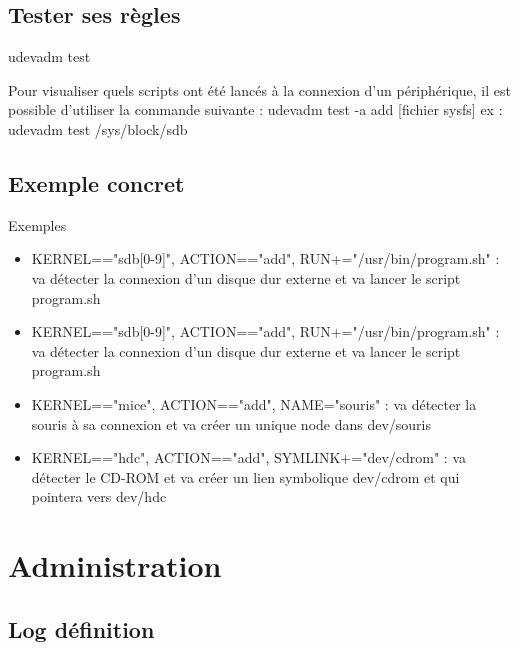 \documentclass{beamer}
\begin{document}
\subsection{Tester ses règles}
\begin{frame}
\begin{exampleblock}{udevadm test} 
		
		Pour visualiser quels scripts ont été lancés à la connexion d'un périphérique, il est possible d'utiliser la commande suivante : 
		udevadm test -a add [fichier sysfs] \newline ex : udevadm test /sys/block/sdb
\end{exampleblock}
\end{frame}

\subsection{Exemple concret}
\begin{frame}
\begin{exampleblock}{Exemples} 
	
	\begin{itemize}
		
		[circle]
		\item KERNEL=="sdb[0-9]", ACTION=="add", RUN+="/usr/bin/program.sh" : va détecter la connexion d'un disque dur externe et va lancer le script program.sh
		\item KERNEL=="sdb[0-9]", ACTION=="add", RUN+="/usr/bin/program.sh" : va détecter la connexion d'un disque dur externe et va lancer le script program.sh
		\item KERNEL=="mice", ACTION=="add", NAME="souris" : va détecter la souris à sa connexion et va créer un unique node dans dev/souris
		\item KERNEL=="hdc", ACTION=="add", SYMLINK+="dev/cdrom" : va détecter le CD-ROM et va créer un lien symbolique dev/cdrom et qui pointera vers dev/hdc
			
	\end{itemize}
\end{exampleblock}
\end{frame}

\section{Administration}

\subsection{Log définition}
\end{document}
